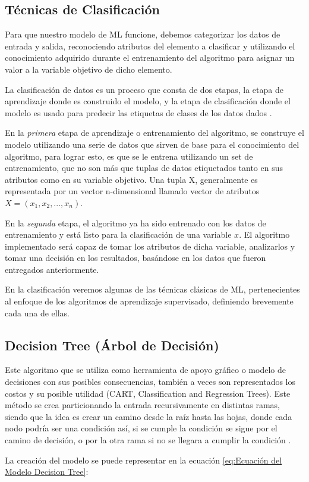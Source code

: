 \doublespacing
\subsection{Técnicas de Clasificación}
Para que nuestro modelo de ML funcione, debemos categorizar los datos de entrada y salida, reconociendo atributos del elemento a clasificar y utilizando el conocimiento adquirido durante el entrenamiento del algoritmo para asignar un valor a la variable objetivo de dicho elemento.\\
\par La clasificación de datos es un proceso que consta de dos etapas, la etapa de aprendizaje donde es construido el modelo, y la etapa de clasificación donde el modelo es usado para predecir las etiquetas de clases de los datos dados \cite{han2012data}.\\
\par En la \textit{primera} etapa de aprendizaje o entrenamiento del algoritmo, se construye el modelo utilizando una serie de datos que sirven de base para el conocimiento del algoritmo, para lograr esto, es que se le entrena utilizando un set de entrenamiento, que no son más que tuplas de datos etiquetados tanto en sus atributos como en su variable objetivo. Una tupla X, generalmente es representada por un vector n-dimensional llamado vector de atributos $ X = (x_{1}, x_{2}, ..., x_{n}) $.\\
\par En la \textit{segunda} etapa, el algoritmo ya ha sido entrenado con los datos de entrenamiento y está listo para la clasificación de una variable $ x $. El algoritmo implementado
será capaz de tomar los atributos de dicha variable, analizarlos y tomar una decisión en los resultados, basándose en los datos que fueron entregados anteriormente.\\
\par En la clasificación veremos algunas de las técnicas clásicas de ML, pertenecientes al enfoque de los algoritmos de aprendizaje supervisado, definiendo brevemente cada una de ellas.\\


\doublespacing
\subsection{Decision Tree (Árbol de Decisión)}
\label{sec:DT}
Este algoritmo que se utiliza como herramienta de apoyo gráfico o modelo de decisiones con sus posibles consecuencias, también a veces son representados los costos y su posible utilidad (CART, Classification and Regression Trees). Este método se crea particionando la entrada recursivamente en distintas ramas, siendo que la idea es crear un camino desde la raíz hasta las hojas, donde cada nodo podría ser una condición así, si se cumple la condición se sigue por el camino de decisión, o por la otra rama si no se llegara a cumplir la condición \cite{Harrington2012}.\\
\par La creación del modelo se puede representar en la ecuación \ref{eq:Ecuación del Modelo Decision Tree}:\\

